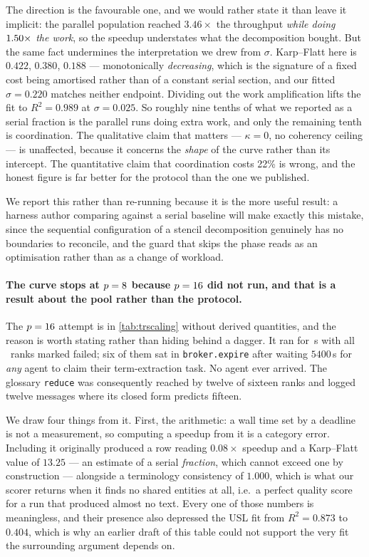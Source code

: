 \documentclass[10pt,twocolumn]{article}
\theoremstyle{definition}
\theoremstyle{plain}
\newcommand{\code}[1]{\texttt{\small #1}}
\begin{document}
The direction is the favourable one, and we would rather state it than leave it
implicit: the parallel population reached $3.46\times$ the throughput \emph{while doing
$1.50\times$ the work}, so the speedup understates what the decomposition
bought. But the same fact undermines the interpretation we drew from $\sigma$. Karp--Flatt
here is $0.422$, $0.380$, $0.188$ --- monotonically \emph{decreasing}, which is the
signature of a fixed cost being amortised rather than of a constant serial section, and
our fitted $\sigma=0.220$ matches neither endpoint. Dividing out the work amplification
lifts the fit to $R^2=0.989$ at $\sigma=0.025$. So roughly nine tenths of what we
reported as a serial fraction is the parallel runs doing extra work, and only the
remaining tenth is coordination. The qualitative claim that matters --- $\kappa=0$, no
coherency ceiling --- is unaffected, because it concerns the \emph{shape} of the curve
rather than its intercept. The quantitative claim that coordination costs 22\% is wrong,
and the honest figure is far better for the protocol than the one we published.

We report this rather than re-running because it is the more useful result: a harness
author comparing against a serial baseline will make exactly this mistake, since the
sequential configuration of a stencil decomposition genuinely has no boundaries to
reconcile, and the guard that skips the phase reads as an optimisation rather than as a
change of workload.

\paragraph{The curve stops at $p=8$ because $p=16$ did not
run, and that is a result about the pool rather than the protocol.} The
$p=16$ attempt is in \cref{tab:trscaling} without derived quantities,
and the reason is worth stating rather than hiding behind a dagger. It ran for
\NScalingFailedWall\,s with all \NScalingFailedRanks\ ranks marked failed; six of them
sat in \code{broker.expire} after waiting $5400$\,s for \emph{any} agent to claim their
term-extraction task. No agent ever arrived. The glossary \code{reduce} was consequently
reached by twelve of sixteen ranks and logged twelve messages where its closed form
predicts fifteen.

We draw four things from it. First, the arithmetic: a wall time set by a deadline is not
a measurement, so computing a speedup from it is a category error. Including it
originally produced a row reading $0.08\times$ speedup and a Karp--Flatt value of
$13.25$ --- an estimate of a serial \emph{fraction}, which cannot exceed one by
construction --- alongside a terminology consistency of $1.000$, which is what our
scorer returns when it finds no shared entities at all, i.e.\ a perfect quality score
for a run that produced almost no text. Every one of those numbers is meaningless, and
their presence also depressed the USL fit from $R^2=0.873$ to $0.404$, which is why an
earlier draft of this table could not support the very fit the surrounding argument
depends on.
\end{document}
